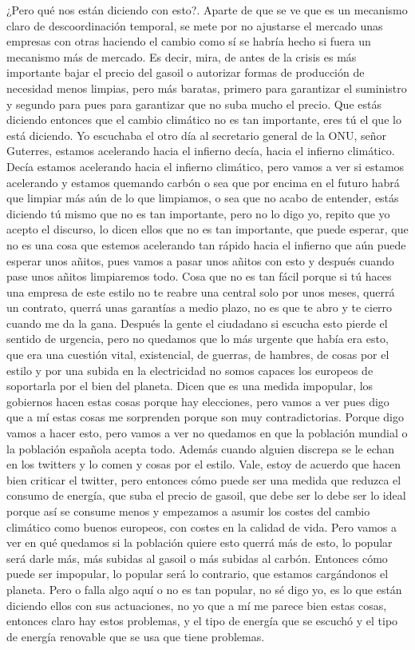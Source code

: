 ¿Pero qué nos están diciendo con esto?. Aparte de que se ve que es un mecanismo claro de descoordinación temporal, se mete por no ajustarse el mercado unas empresas con otras haciendo el cambio como sí se habría hecho si fuera un mecanismo más de mercado. Es decir, mira, de antes de la crisis es más importante bajar el precio del gasoil o autorizar formas de producción de necesidad menos limpias, pero más baratas, primero para garantizar el suministro y segundo para pues para garantizar que no suba mucho el precio. Que estás diciendo entonces que el cambio climático no es tan importante, eres tú el que lo está diciendo. Yo escuchaba el otro día al secretario general de la ONU, señor Guterres, estamos acelerando hacia el infierno decía, hacia el infierno climático. Decía estamos acelerando hacia el infierno climático, pero vamos a ver si estamos acelerando y estamos quemando carbón o sea que por encima en el futuro habrá que limpiar más aún de lo que limpiamos, o sea que no acabo de entender, estás diciendo tú mismo que no es tan importante, pero no lo digo yo, repito que yo acepto el discurso, lo dicen ellos que no es tan importante, que puede esperar, que no es una cosa que estemos acelerando tan rápido hacia el infierno que aún puede esperar unos añitos, pues vamos a pasar unos añitos con esto y después cuando pase unos añitos limpiaremos todo. Cosa que no es tan fácil porque si tú haces una empresa de este estilo no te reabre una central solo por unos meses, querrá un contrato, querrá unas garantías a medio plazo, no es que te abro y te cierro cuando me da la gana.
Después la gente el ciudadano si escucha esto pierde el sentido de urgencia, pero no quedamos que lo más urgente que había era esto, que era una cuestión vital, existencial, de guerras, de hambres, de cosas por el estilo y por una subida en la electricidad no somos capaces los europeos de soportarla por el bien del planeta. Dicen que es una medida impopular, los gobiernos hacen estas cosas porque hay elecciones, pero vamos a ver pues digo que a mí estas cosas me sorprenden porque son muy contradictorias. Porque digo vamos a hacer esto, pero vamos a ver no quedamos en que la población mundial o la población española acepta todo. Además cuando alguien discrepa se le echan en los twitters y lo comen y cosas por el estilo. Vale, estoy de acuerdo que hacen bien criticar el twitter, pero entonces cómo puede ser una medida que reduzca el consumo de energía, que suba el precio de gasoil, que debe ser lo debe ser lo ideal porque así se consume menos y empezamos a asumir los costes del cambio climático como buenos europeos, con costes en la calidad de vida. Pero vamos a ver en qué quedamos si la población quiere esto querrá más de esto, lo popular será darle más, más subidas al gasoil o más subidas al carbón. Entonces cómo puede ser impopular, lo popular será lo contrario, que estamos cargándonos el planeta. Pero o falla algo aquí o no es tan popular, no sé digo yo, es lo que están diciendo ellos con sus actuaciones, no yo que a mí me parece bien estas cosas, entonces claro hay estos problemas, y el tipo de energía que se escuchó y el tipo de energía renovable que se usa que tiene problemas.

